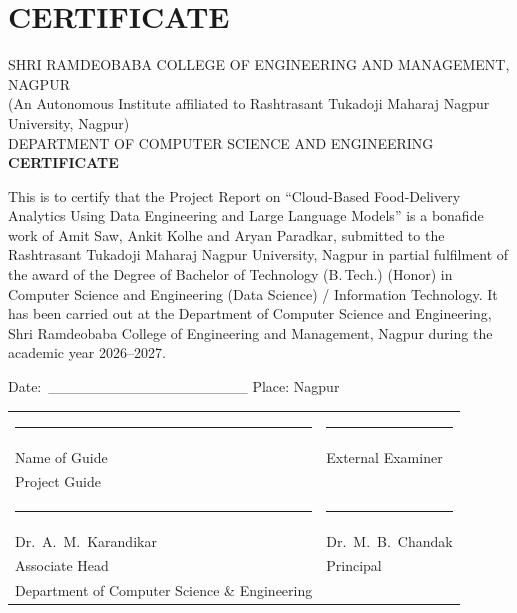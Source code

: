 \documentclass[12pt,a4paper]{report}
\begin{document}
\setcounter{page}{2}   %

\chapter*{CERTIFICATE}
\begin{center}
{\small SHRI RAMDEOBABA COLLEGE OF ENGINEERING AND MANAGEMENT, NAGPUR}\\[0.1cm]
{\small (An Autonomous Institute affiliated to Rashtrasant Tukadoji Maharaj Nagpur University, Nagpur)}\\[0.1cm]
{\small DEPARTMENT OF COMPUTER SCIENCE AND ENGINEERING}\\[1.5cm]
{\Large\bfseries CERTIFICATE}
\end{center}

\vspace{0.8cm}
\noindent This is to certify that the Project Report on ``Cloud-Based Food-Delivery Analytics Using Data Engineering and Large Language Models'' is a bonafide work of Amit Saw, Ankit Kolhe and Aryan Paradkar, submitted to the Rashtrasant Tukadoji Maharaj Nagpur University, Nagpur in partial fulfilment of the award of the Degree of Bachelor of Technology (B.\,Tech.) (Honor) in Computer Science and Engineering (Data Science) / Information Technology. It has been carried out at the Department of Computer Science and Engineering, Shri Ramdeobaba College of Engineering and Management, Nagpur during the academic year 2026--2027.

\vspace{1.5cm}
\noindent Date:\ \_\_\_\_\_\_\_\_\_\_\_\_\_\_\_\_\_\_\_ \hfill Place: Nagpur

\vspace{2.0cm}
\begin{tabular}{@{}p{}p{}@{}}
\rule{6.5cm}{0.4pt} & \rule{6.5cm}{0.4pt} \\
Name of Guide & External Examiner \\
Project Guide &  \\[1.2cm]
\rule{6.5cm}{0.4pt} & \rule{6.5cm}{0.4pt} \\
Dr.\ A.\ M.\ Karandikar & Dr.\ M.\ B.\ Chandak \\
Associate Head & Principal \\
Department of Computer Science \& Engineering & \\
\end{tabular}
\end{document}
